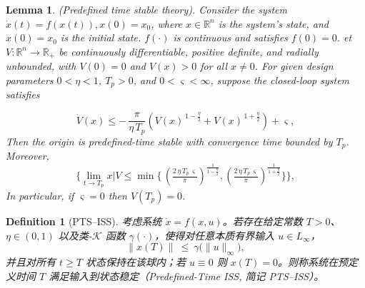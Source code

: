 \documentclass[pdflatex,sn-mathphys-num]{sn-jnl}%
\theoremstyle{thmstyleone}%
\newtheorem{lemma}{Lemma}
\theoremstyle{thmstyletwo}%
\theoremstyle{thmstylethree}%
\newtheorem{definition}{Definition}%
\begin{document}
\begin{lemma} \label{lemma:1}\cite{WangEtAl_2022_Adaptivefuzzy} (Predefined time stable theory). Consider the system $
	\dot{x}(t) = f(x(t)), x(0) = x_0
$, where $x \in \mathbb{R}^n$ is the system's state, and $x(0) = x_0$ is the initial state. $f(\cdot)$ is continuous and satisfies $f(0) = 0$. et $V:\mathbb{R}^n\to\mathbb{R}_+$ be continuously differentiable, positive definite, and radially unbounded, with $V(0)=0$ and $V(x)>0$ for all $x\neq 0$.
For given design parameters $0<\eta<1$, $T_p>0$, and $0<\varsigma<\infty$, suppose the closed-loop system satisfies
			  
\begin{equation}	\label{eq:7}
	\dot V(x) \le
	-\,\frac{\pi}{\eta\,T_p}\left(V(x)^{\,1-\frac{\eta}{2}}+V(x)^{\,1+\frac{\eta}{2}}\right)
	+\varsigma,
\end{equation}
Then the origin is predefined-time stable with convergence time bounded by $T_p$. Moreover,
\begin{equation}\label{eq:8}
	\Biggl\{ \lim_{t\to T_p} x|V
	\le
	\min\!\Biggl\{\,
	\left(\tfrac{2\,\eta\,T_p\,\varsigma}{\pi}\right)^{\frac{1}{1-\frac{\eta}{2}}}\!,
	\left(\tfrac{2\,\eta\,T_p\,\varsigma}{\pi}\right)^{\frac{1}{1+\frac{\eta}{2}}}
	\Biggr\} \Biggr\},
\end{equation}
In particular, if $\varsigma=0$ then $V(T_p)=0$.
\end{lemma}



\begin{definition}[PTS--ISS]\label{def:PTS-ISS}
	考虑系统 $\dot x = f(x,u)$。若存在给定常数 $T>0$、$\eta\in(0,1)$ 以及类-$\mathcal{K}$ 函数 $\gamma(\cdot)$，使得对任意本质有界输入 $u\in L_\infty$，
	\[
	\|x(T)\|\ \le\ \gamma\big(\|u\|_\infty\big),
	\]
	并且对所有 $t\ge T$ 状态保持在该球内；若 $u\equiv 0$ 则 $x(T)=0$。则称系统在预定义时间 $T$ 满足输入到状态稳定（Predefined-Time ISS, 简记 PTS--ISS）。
	\end{definition}
	
\end{document}
